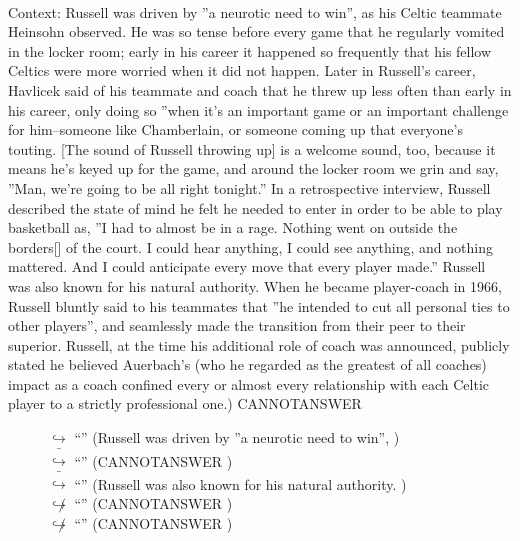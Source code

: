 \documentclass[11pt,a4paper, onecolumn]{article}
\begin{document}
\\ Context: Russell was driven by ''a neurotic need to win'', as his Celtic teammate Heinsohn observed. He was so tense before every game that he regularly vomited in the locker room; early in his career it happened so frequently that his fellow Celtics were more worried when it did not happen. Later in Russell's career, Havlicek said of his teammate and coach that he threw up less often than early in his career, only doing so ''when it's an important game or an important challenge for him--someone like Chamberlain, or someone coming up that everyone's touting. [The sound of Russell throwing up] is a welcome sound, too, because it means he's keyed up for the game, and around the locker room we grin and say, ''Man, we're going to be all right tonight.'' In a retrospective interview, Russell described the state of mind he felt he needed to enter in order to be able to play basketball as, ''I had to almost be in a rage. Nothing went on outside the borders[] of the court. I could hear anything, I could see anything, and nothing mattered. And I could anticipate every move that every player made.'' Russell was also known for his natural authority. When he became player-coach in 1966, Russell bluntly said to his teammates that ''he intended to cut all personal ties to other players'', and seamlessly made the transition from their peer to their superior. Russell, at the time his additional role of coach was announced, publicly stated he believed Auerbach's (who he regarded as the greatest of all coaches) impact as a coach confined every or almost every relationship with each Celtic player to a strictly professional one.) CANNOTANSWER

\begin{figure}[t] \small \begin{tcolorbox}[boxsep=0pt,left=5pt,right=0pt,top=2pt,colback = yellow!5] \begin{dialogue}
 \small 
\colorbox{pink!25}{$\hookrightarrow$}
{ ``'' (Russell was driven by ''a neurotic need to win'', ) }
\\
\colorbox{pink!25}{ $\bar{\hookrightarrow}$}
{ ``'' (CANNOTANSWER ) }
\\
\colorbox{pink!25}{ $\bar{\hookrightarrow}$}
{ ``'' (Russell was also known for his natural authority. ) }
\\
\colorbox{pink!25}{$\not\hookrightarrow$}
{ ``'' (CANNOTANSWER ) }
\\
\colorbox{pink!25}{$\not\hookrightarrow$}
{ ``'' (CANNOTANSWER ) }
\\
 \end{dialogue}\end{tcolorbox}\end{figure}
\end{document}
